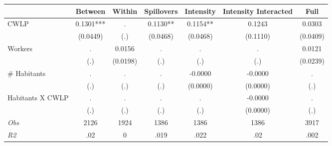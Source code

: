 \begin{tabular}{l*{6}{c}}\hline&\multicolumn{1}{c}{Between}&\multicolumn{1}{c}{Within}&\multicolumn{1}{c}{Spillovers}&\multicolumn{1}{c}{Intensity}&\multicolumn{1}{c}{Intensity Interacted}&\multicolumn{1}{c}{Full}\\ \hline 
CWLP & 0.1301*** & . & 0.1130** & 0.1154** & 0.1243 & 0.0303 \\
 & (0.0449) & (.) & (0.0468) & (0.0468) & (0.1110) & (0.0409) \\
Workers & . & 0.0156 & . & . & . & 0.0121 \\
 & (.) & (0.0198) & (.) & (.) & (.) & (0.0239) \\
\# Habitants & . & . & . & -0.0000 & -0.0000 & . \\
 & (.) & (.) & (.) & (0.0000) & (0.0000) & (.) \\
Habitants X CWLP & . & . & . & . & -0.0000 & . \\
 & (.) & (.) & (.) & (.) & (0.0000) & (.) \\
\hline \textit{Obs} & 2126 & 1924 & 1386 & 1386 & 1386 & 3917 \\ \textit{R2} & .02 & 0 & .019 & .022 & .02 & .002 \\ \hline \end{tabular}
